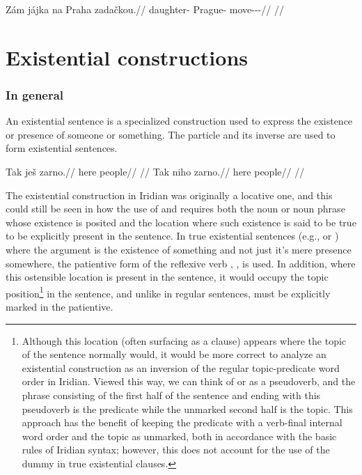 \pex
\begingl
    \gla Zám jájka na Praha zadačkou.//
    \glb \Neg{} daughter-\Dim{} \Loc{} Prague-\Acc{} move-\Av{}-\Pf{}-\Nz{}//
    \glft {}//
\endgl
\xe




\section{Existential constructions}
\label{sec:exst}

\subsubsection{In general}
An existential sentence is a specialized construction used to express the
existence or presence of someone or something. The particle  and its
inverse  are used to form existential sentences. 
\begin{multicols}{2}
\pex
\a\begingl
\gla Tak ješ zarno.//
\glb here \Exst{} people//
\glft {}//
\endgl
\a\begingl
\gla Tak niho zarno.//
\glb here \N{}\Exst{} people//
\glft {}//
\endgl
\xe
\end{multicols}

The existential construction in Iridian was originally a
locative one, and this could still be seen in how the use of
 and  requires both the noun or noun phrase whose existence
is posited and the location where such existence is said to be true to be
explicitly present in the sentence. In true existential sentences (e.g.,
 or ) where the argument is the
existence of something and not just it's mere presence somewhere, the patientive
form of the reflexive verb , , is used. In addition, where this
ostensible location is present in the sentence, it would occupy the
topic position\footnote{Although this location (often surfacing as
a  clause) appears where the topic of the sentence normally would, it
would be more correct to analyze an existential construction as an inversion of
the regular topic-predicate word order in Iridian. Viewed this way, we can think
of  or  as a pseudoverb, and the phrase consisting of the
first half of the sentence and ending with this pseudoverb is the predicate
while the unmarked second half is the topic. This approach has the benefit of
keeping the predicate with a verb-final internal word order and the topic as
unmarked, both in accordance with the basic rules of Iridian syntax; however,
this does not account for the use of the dummy  in true existential
clauses.} in the sentence, and unlike in regular sentences, must be explicitly
marked in the patientive.


